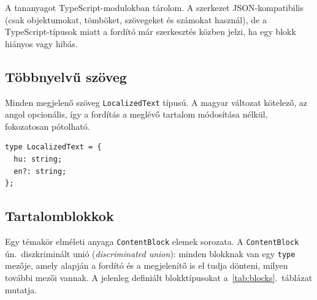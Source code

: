 \documentclass[12pt,a4paper]{report}
\begin{document}
A tananyagot TypeScript-modulokban tárolom. A szerkezet JSON-kompatibilis
(csak objektumokat, tömböket, szövegeket és számokat használ), de a
TypeScript-típusok miatt a fordító már szerkesztés közben jelzi, ha
egy blokk hiányos vagy hibás.

\subsection{Többnyelvű szöveg}

Minden megjelenő szöveg \texttt{LocalizedText} típusú. A magyar
változat kötelező, az angol opcionális, így a fordítás a meglévő
tartalom módosítása nélkül, fokozatosan pótolható.

\begin{lstlisting}
type LocalizedText = {
  hu: string;
  en?: string;
};
\end{lstlisting}

\subsection{Tartalomblokkok}

Egy témakör elméleti anyaga \texttt{ContentBlock} elemek sorozata.
A \texttt{ContentBlock} ún.\ diszkriminált unió (\emph{discriminated
union}): minden blokknak van egy \texttt{type} mezője, amely alapján a
fordító és a megjelenítő is el tudja dönteni, milyen további mezői
vannak. A jelenleg definiált blokktípusokat
a~\ref{tab:blocks}.~táblázat mutatja.
\end{document}
